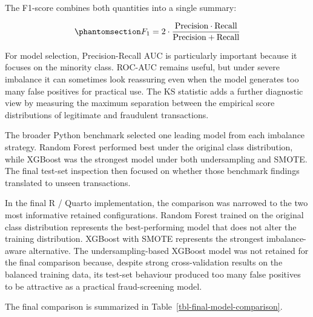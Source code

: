 \documentclass[
  12pt,
  letterpaper,
]{book}
\begin{document}
The F1-score combines both quantities into a single summary:

\begin{equation}\phantomsection\label{eq-f1-score}{
F_1 = 2 \cdot \frac{\text{Precision} \cdot \text{Recall}}{\text{Precision} + \text{Recall}}
}\end{equation}

For model selection, Precision-Recall AUC is particularly important
because it focuses on the minority class. ROC-AUC remains useful, but
under severe imbalance it can sometimes look reassuring even when the
model generates too many false positives for practical use. The KS
statistic adds a further diagnostic view by measuring the maximum
separation between the empirical score distributions of legitimate and
fraudulent transactions.

The broader Python benchmark selected one leading model from each
imbalance strategy. Random Forest performed best under the original
class distribution, while XGBoost was the strongest model under both
undersampling and SMOTE. The final test-set inspection then focused on
whether those benchmark findings translated to unseen transactions.

In the final R / Quarto implementation, the comparison was narrowed to
the two most informative retained configurations. Random Forest trained
on the original class distribution represents the best-performing model
that does not alter the training distribution. XGBoost with SMOTE
represents the strongest imbalance-aware alternative. The
undersampling-based XGBoost model was not retained for the final
comparison because, despite strong cross-validation results on the
balanced training data, its test-set behaviour produced too many false
positives to be attractive as a practical fraud-screening model.

The final comparison is summarized in
Table~\ref{tbl-final-model-comparison}.
\end{document}
